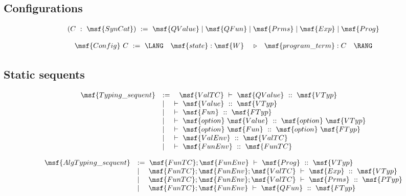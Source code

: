 \documentclass{article}
\begin{document}
\subsection{Configurations}

\begin{gather}
   (C \ : \ \msf{SynCat}) \ := \ \msf{QValue} \mid \msf{QFun} \mid
  \msf{Prms} \mid \msf{Exp} \mid \msf{Prog}
\end{gather}  



\begin{gather}
\begin{array}{llll}
    \msf{Config} \ C \ := \
    \LANG & \msf{state} : \msf{W} \ & \triangleright &
 \msf{program\_term} : C \quad \RANG
\end{array}
\end{gather}  



\subsection{Static sequents}

\begin{gather}
  \begin{array}{lll}
 \msf{Typing\_sequent} & := 
%
 \quad \msf{ValTC} \ \vdash \ \msf{QValue} \ :: \ \msf{VTyp} \\
%
& \mid \quad \ \vdash \ \msf{Value} \ :: \ \msf{VTyp} \\
%
& \mid \quad \ \vdash \ \msf{Fun} \ :: \ \msf{FTyp} \\
%
& \mid \quad \ \vdash \ \msf{option} \ \msf{Value} \ :: \ \msf{option}
 \ \msf{VTyp} \\
%
& \mid \quad \ \vdash \ \msf{option} \ \msf{Fun} \ :: \ \msf{option}
 \ \msf{FTyp} \\
%
& \mid \quad \ \vdash \ \msf{ValEnv} \ :: \ \msf{ValTC} \\
& \mid \quad \ \vdash \ \msf{FunEnv} \ :: \ \msf{FunTC} 
\end{array}
\end{gather}  


\begin{gather}
  \begin{array}{lll}
 \msf{AlgTyping\_sequent} & := 
%
\ \msf{FunTC}; \msf{FunEnv} \ \vdash \ \msf{Prog} \ :: \ \msf{VTyp} \\
%
& \mid \quad \msf{FunTC}; \msf{FunEnv}; \msf{ValTC} \ \vdash
\ \msf{Exp} \ :: \ \msf{VTyp} \\
%
 & \mid \quad \msf{FunTC}; \msf{FunEnv}; \msf{ValTC} \ \vdash
\ \msf{Prms} \ :: \ \msf{PTyp} \\
%
& \mid \quad \msf{FunTC}; \msf{FunEnv} \ \vdash \ \msf{QFun} \ ::
\ \msf{FTyp}
\end{array}
\end{gather}  
\end{document}
